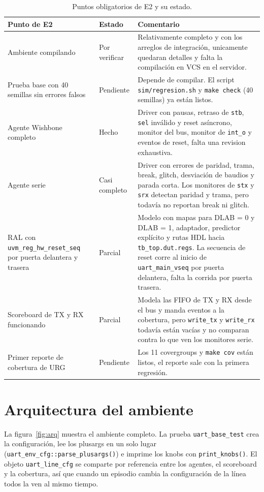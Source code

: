 \documentclass[11pt,letterpaper]{article}
\newcommand{\cod}[1]{\texttt{#1}}
\begin{document}
\begin{table}[h]
\centering\small
\caption{Puntos obligatorios de E2 y su estado.}\label{tab:estado}
\begin{tabularx}{\textwidth}{>{\raggedright\arraybackslash}p{4.2cm} p{2.1cm} Y}
\toprule
Punto de E2 & Estado & Comentario \\
\midrule
Ambiente compilando & Por verificar & Relativamente completo y con los arreglos de integración, unicamente quedaran detalles y falta la compilación en VCS en el servidor. \\
Prueba base con 40 semillas sin errores falsos & Pendiente & Depende de compilar. El script \cod{sim/regresion.sh} y \cod{make check} (40 semillas) ya están listos. \\
Agente Wishbone completo & Hecho & Driver con pausas, retraso de \cod{stb}, \cod{sel} inválido y reset asíncrono, monitor del bus, monitor de \cod{int\_o} y eventos de reset, falta una revision exhaustiva. \\
Agente serie & Casi completo & Driver con errores de paridad, trama, break, glitch, desviación de baudios y parada corta. Los monitores de \cod{stx} y \cod{srx} detectan paridad y trama, pero todavía no reportan break ni glitch. \\
RAL con \cod{uvm\_reg\_hw\_reset\_seq} por puerta delantera y trasera & Parcial & Modelo con mapas para DLAB = 0 y DLAB = 1, adaptador, predictor explícito y rutas HDL hacia \cod{tb\_top.dut.regs}. La secuencia de reset corre al inicio de \cod{uart\_main\_vseq} por puerta delantera, falta la corrida por puerta trasera. \\
Scoreboard de TX y RX funcionando & Parcial & Modela las FIFO de TX y RX desde el bus y manda eventos a la cobertura, pero \cod{write\_tx} y \cod{write\_rx} todavía están vacías y no comparan contra lo que ven los monitores serie. \\
Primer reporte de cobertura de URG & Pendiente & Los 11 covergroups y \cod{make cov} están listos, el reporte sale con la primera regresión. \\
\bottomrule
\end{tabularx}
\end{table}

\section{Arquitectura del ambiente}

La figura~\ref{fig:arq} muestra el ambiente completo. La prueba \cod{uart\_base\_test} crea la configuración, lee los plusargs en un solo lugar (\cod{uart\_env\_cfg::parse\_plusargs()}) e imprime los knobs con \cod{print\_knobs()}. El objeto \cod{uart\_line\_cfg} se comparte por referencia entre los agentes, el scoreboard y la cobertura, así que cuando un episodio cambia la configuración de la línea todos la ven al mismo tiempo.
\end{document}
